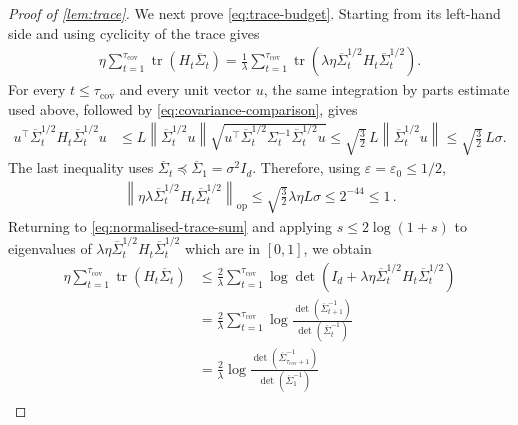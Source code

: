 \documentclass[11pt]{article}
\newcommand{\tr}{\operatorname{tr}}
\newcommand{\op}{\mathrm{op}}
\newcommand{\1}{\mathbf 1}
\newcommand{\eps}{\varepsilon}
\newcommand{\norm}[1]{\left\lVert #1\right\rVert}
\begin{document}
\begin{proof}[Proof of \cref{lem:trace}]
    We next prove \eqref{eq:trace-budget}.  Starting from its left-hand side
    and using cyclicity of the trace gives
    \begin{align}
        \eta\sum_{t=1}^{\tau_{\mathrm{cov}}}
        \tr(H_t\overline\Sigma_t)
        =
        \frac1\lambda\sum_{t=1}^{\tau_{\mathrm{cov}}}
        \tr\left(
        \lambda\eta\overline\Sigma_t^{1/2}H_t
        \overline\Sigma_t^{1/2}
        \right).
        \label{eq:normalised-trace-sum}
    \end{align}
    For every $t\leq\tau_{\mathrm{cov}}$ and every unit vector $u$, the same integration by
    parts estimate used above, followed by
    \eqref{eq:covariance-comparison}, gives
    \begin{align}
        u^\top\overline\Sigma_t^{1/2}H_t
        \overline\Sigma_t^{1/2}u
         & \leq
        L\norm{\overline\Sigma_t^{1/2}u}
        \sqrt{u^\top\overline\Sigma_t^{1/2}
            \Sigma_t^{-1}\overline\Sigma_t^{1/2}u}
        \leq
        \sqrt{\frac32}\,L
        \norm{\overline\Sigma_t^{1/2}u}
        \leq
        \sqrt{\frac32}\,L\sigma.
        \label{eq:normalised-H}
    \end{align}
    The last inequality uses
    $\overline\Sigma_t\preceq\overline\Sigma_1=\sigma^2I_d$.
    Therefore, using $\eps=\eps_0\leq1/2$,
    \begin{align}
        \norm{\eta\lambda\overline\Sigma_t^{1/2}H_t\overline\Sigma_t^{1/2}}_{\op}
        \leq
        \sqrt{\frac32}\lambda\eta L\sigma
        \leq
        2^{-44}
        \leq
        1\,.
    \end{align}
    Returning to
    \eqref{eq:normalised-trace-sum} and applying
    $s\leq2\log(1+s)$ to eigenvalues of $\lambda\eta\overline\Sigma_t^{1/2}H_t\overline\Sigma_t^{1/2}$
    which are in $[0,1]$, we obtain
    \begin{align}
        \eta\sum_{t=1}^{\tau_{\mathrm{cov}}}
        \tr(H_t\overline\Sigma_t)
         & \leq
        \frac2\lambda\sum_{t=1}^{\tau_{\mathrm{cov}}}
        \log\det\left(
        I_d+\lambda\eta\overline\Sigma_t^{1/2}H_t
        \overline\Sigma_t^{1/2}
        \right)                        \\
         & =
        \frac2\lambda\sum_{t=1}^{\tau_{\mathrm{cov}}}
        \log\frac{\det(\overline\Sigma_{t+1}^{-1})}
        {\det(\overline\Sigma_t^{-1})} \\
         & =
        \frac2\lambda
        \log\frac{\det(\overline\Sigma_{\tau_{\mathrm{cov}}+1}^{-1})}
        {\det(\overline\Sigma_1^{-1})} \\

\end{align}
\end{proof}
\end{document}
